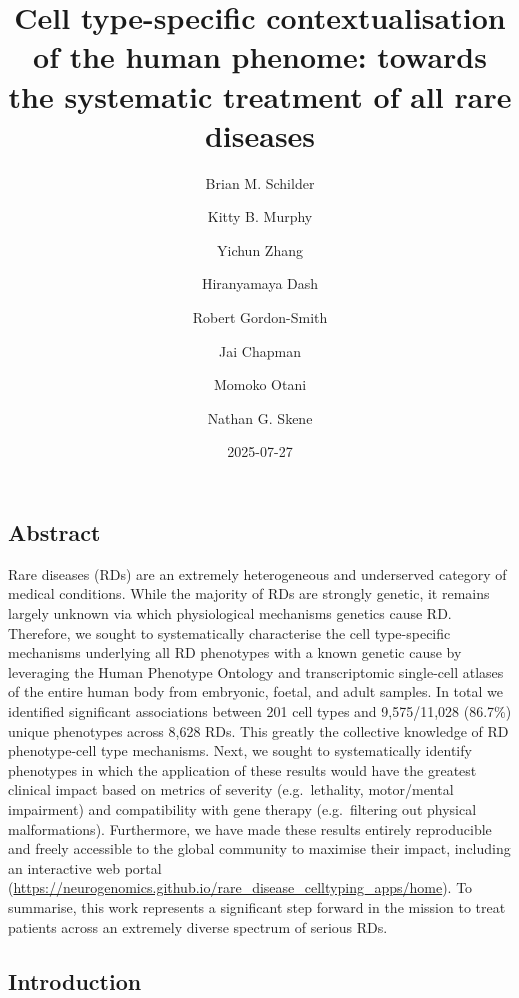 \documentclass[
]{article}
\title{Cell type-specific contextualisation of the human phenome:
towards the systematic treatment of all rare diseases}
\author{Brian M. Schilder \and Kitty B. Murphy \and Yichun
Zhang \and Hiranyamaya Dash \and Robert Gordon-Smith \and Jai
Chapman \and Momoko Otani \and Nathan G. Skene}
\date{2025-07-27}
\begin{document}
\maketitle


\newpage{}

\subsection{Abstract}\label{abstract}

Rare diseases (RDs) are an extremely heterogeneous and underserved
category of medical conditions. While the majority of RDs are strongly
genetic, it remains largely unknown via which physiological mechanisms
genetics cause RD. Therefore, we sought to systematically characterise
the cell type-specific mechanisms underlying all RD phenotypes with a
known genetic cause by leveraging the Human Phenotype Ontology and
transcriptomic single-cell atlases of the entire human body from
embryonic, foetal, and adult samples. In total we identified significant
associations between 201 cell types and 9,575/11,028 (86.7\%) unique
phenotypes across 8,628 RDs. This greatly the collective knowledge of RD
phenotype-cell type mechanisms. Next, we sought to systematically
identify phenotypes in which the application of these results would have
the greatest clinical impact based on metrics of severity
(e.g.~lethality, motor/mental impairment) and compatibility with gene
therapy (e.g.~filtering out physical malformations). Furthermore, we
have made these results entirely reproducible and freely accessible to
the global community to maximise their impact, including an interactive
web portal
(\url{https://neurogenomics.github.io/rare_disease_celltyping_apps/home}).
To summarise, this work represents a significant step forward in the
mission to treat patients across an extremely diverse spectrum of
serious RDs.

\subsection{Introduction}\label{sec-introduction}
\end{document}
